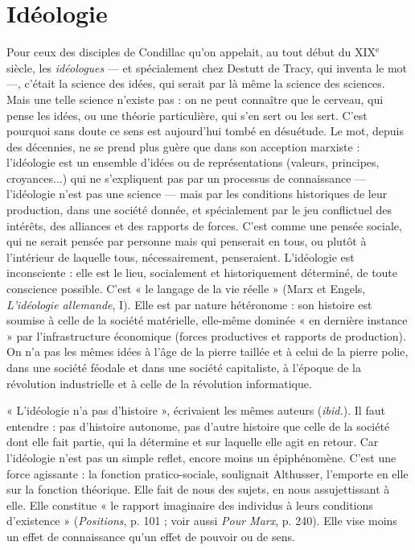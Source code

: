 \section{Idéologie}
Pour ceux des disciples de Condillac qu’on appelait, au tout
début du {\footnotesize XIX$^\text{e}$} siècle, les {\it idéologues} — et spécialement chez Destutt
de Tracy, qui inventa le mot —, c'était la science des idées, qui serait par là
même la science des sciences. Mais une telle science n’existe pas : on ne peut
connaître que le cerveau, qui pense les idées, ou une théorie particulière, qui
s’en sert ou les sert. C’est pourquoi sans doute ce sens est aujourd’hui tombé en
désuétude. Le mot, depuis des décennies, ne se prend plus guère que dans son
acception marxiste : l'idéologie est un ensemble d’idées ou de représentations
(valeurs, principes, croyances...) qui ne s'expliquent pas par un processus de
connaissance — l’idéologie n’est pas une science — mais par les conditions historiques
de leur production, dans une société donnée, et spécialement par le jeu
conflictuel des intérêts, des alliances et des rapports de forces. C’est comme une
pensée sociale, qui ne serait pensée par personne mais qui penserait en tous, ou
plutôt à l’intérieur de laquelle tous, nécessairement, penseraient. L’idéologie est
inconsciente : elle est le lieu, socialement et historiquement déterminé, de toute
conscience possible. C’est « le langage de la vie réelle » (Marx et Engels, {\it L'idéologie
allemande}, I). Elle est par nature hétéronome : son histoire est soumise à
celle de la société matérielle, elle-même dominée « en dernière instance » par
l'infrastructure économique (forces productives et rapports de production). On
n’a pas les mêmes idées à l’âge de la pierre taillée et à celui de la pierre polie,
dans une société féodale et dans une société capitaliste, à l’époque de la révolution
industrielle et à celle de la révolution informatique.

« L’idéologie n’a pas d’histoire », écrivaient les mêmes auteurs ({\it ibid.}). Il
faut entendre : pas d’histoire autonome, pas d’autre histoire que celle de la
société dont elle fait partie, qui la détermine et sur laquelle elle agit en retour.
Car l'idéologie n’est pas un simple reflet, encore moins un épiphénomène.
C’est une force agissante : la fonction pratico-sociale, soulignait Althusser,
l'emporte en elle sur la fonction théorique. Elle fait de nous des sujets, en nous
assujettissant à elle. Elle constitue « le rapport imaginaire des individus à leurs
conditions d’existence » ({\it Positions}, p. 101 ; voir aussi {\it Pour Marx}, p. 240). Elle
vise moins un effet de connaissance qu’un effet de pouvoir ou de sens.

